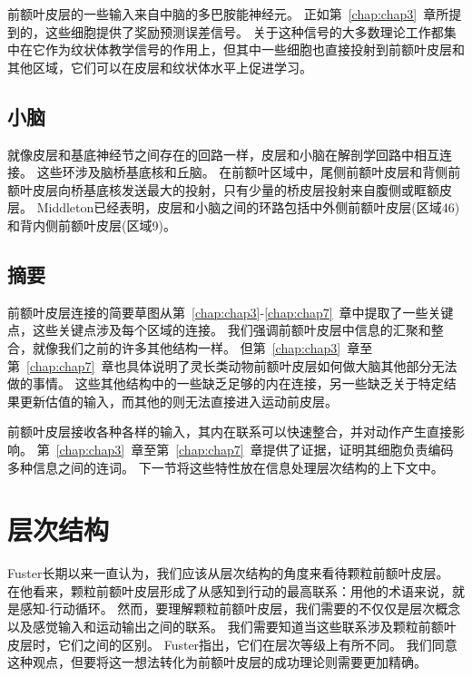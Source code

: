 前额叶皮层的一些输入来自中脑的多巴胺能神经元。
正如第~\ref{chap:chap3}~章所提到的，这些细胞提供了奖励预测误差信号\cite{schultz1998predictive}。
关于这种信号的大多数理论工作都集中在它作为纹状体教学信号的作用上，但其中一些细胞也直接投射到前额叶皮层和其他区域\cite{gaspar1992topography}，它们可以在皮层和纹状体水平上促进学习\cite{miller2007rules}。



\subsection{小脑}
\par

就像皮层和基底神经节之间存在的回路一样，皮层和小脑在解剖学回路中相互连接。
这些环涉及脑桥基底核和丘脑\cite{houk1995distributed}。
在前额叶区域中，尾侧前额叶皮层和背侧前额叶皮层向桥基底核发送最大的投射，只有少量的桥皮层投射来自腹侧或眶额皮层\cite{schmahmann1997anatomic,glickstein2008cerebellum}。
Middleton\cite{middleton1998cerebellar,middleton2001cerebellar}已经表明，皮层和小脑之间的环路包括中外侧前额叶皮层(区域46)和背内侧前额叶皮层(区域9)。



\subsection{摘要}
\par

前额叶皮层连接的简要草图从第~\ref{chap:chap3}-\ref{chap:chap7}~章中提取了一些关键点，这些关键点涉及每个区域的连接。
我们强调前额叶皮层中信息的汇聚和整合，就像我们之前的许多其他结构一样。
但第~\ref{chap:chap3}~章至第~\ref{chap:chap7}~章也具体说明了灵长类动物前额叶皮层如何做大脑其他部分无法做的事情。
这些其他结构中的一些缺乏足够的内在连接，另一些缺乏关于特定结果更新估值的输入，而其他的则无法直接进入运动前皮层。
\par


前额叶皮层接收各种各样的输入，其内在联系可以快速整合，并对动作产生直接影响。
第~\ref{chap:chap3}~章至第~\ref{chap:chap7}~章提供了证据，证明其细胞负责编码多种信息之间的连词。
下一节将这些特性放在信息处理层次结构的上下文中。



\section{层次结构}
\par

Fuster\cite{fuster2000executive}长期以来一直认为，我们应该从层次结构的角度来看待颗粒前额叶皮层。
在他看来，颗粒前额叶皮层形成了从感知到行动的最高联系：用他的术语来说，就是感知-行动循环。
然而，要理解颗粒前额叶皮层，我们需要的不仅仅是层次概念以及感觉输入和运动输出之间的联系。
我们需要知道当这些联系涉及颗粒前额叶皮层时，它们之间的区别。
Fuster指出，它们在层次等级上有所不同。
我们同意这种观点，但要将这一想法转化为前额叶皮层的成功理论则需要更加精确。
\par


